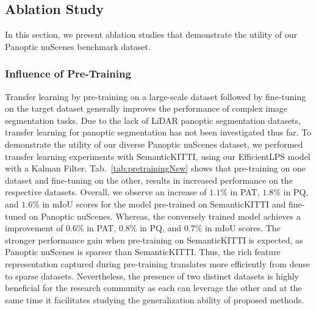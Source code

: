 \documentclass[letterpaper, 10 pt, journal, twoside]{IEEEtran}
\newcommand{\tabref}[1]{Tab.~\ref{#1}}
\begin{document}
\subsection{Ablation Study}
\label{subsec:ablation}

In this section, we present ablation studies that demonstrate the utility of our Panoptic nuScenes benchmark dataset.

\subsubsection{Influence of Pre-Training}
Transfer learning by pre-training on a large-scale dataset followed by fine-tuning on the target dataset generally improves the performance of complex image segmentation tasks. Due to the lack of LiDAR panoptic segmentation datasets, transfer learning for panoptic segmentation has not been investigated thus far. To demonstrate the utility of our diverse Panoptic nuScenes dataset, we performed transfer learning experiments with SemanticKITTI, using our EfficientLPS model with a Kalman Filter.
\tabref{tab:pretrainingNew} shows that pre-training on one dataset and fine-tuning on the other, results in increased performance on the respective datasets. Overall, we observe an increase of $1.1\%$ in PAT, $1.8\%$ in PQ, and $1.6\%$ in mIoU scores for the model pre-trained on SemanticKITTI and fine-tuned on Panoptic nuScenes. Whereas, the conversely trained model achieves a improvement of $0.6\%$ in PAT, $0.8\%$ in PQ, and $0.7\%$ in mIoU scores. The stronger performance gain when pre-training on SemanticKITTI is expected, as Panoptic nuScenes is sparser than SemanticKITTI. Thus, the rich feature representation captured during pre-training translates more efficiently from dense to sparse datasets. Nevertheless, the presence of two distinct datasets is highly beneficial for the research community as each can leverage the other and at the same time it facilitates studying the generalization ability of proposed methods.
\end{document}
